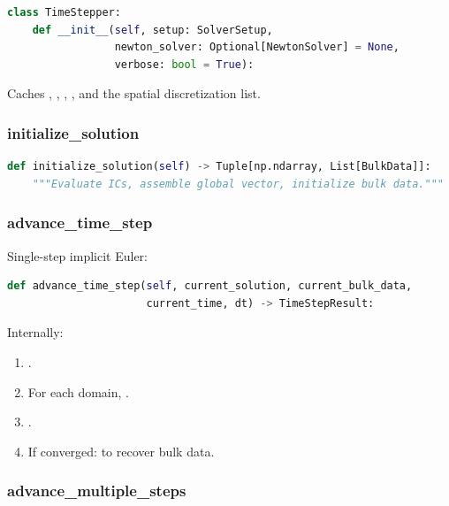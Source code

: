 \begin{lstlisting}[language=Python, caption={TimeStepper constructor}]
class TimeStepper:
    def __init__(self, setup: SolverSetup,
                 newton_solver: Optional[NewtonSolver] = None,
                 verbose: bool = True):
\end{lstlisting}

\noindent Caches , ,
, , and the spatial
discretization list.

\subsubsection{initialize\_solution}

\begin{lstlisting}[language=Python, caption={Initial condition setup}]
def initialize_solution(self) -> Tuple[np.ndarray, List[BulkData]]:
    """Evaluate ICs, assemble global vector, initialize bulk data."""
\end{lstlisting}

\subsubsection{advance\_time\_step}

Single-step implicit Euler:

\begin{lstlisting}[language=Python, caption={One time step}]
def advance_time_step(self, current_solution, current_bulk_data,
                      current_time, dt) -> TimeStepResult:
\end{lstlisting}

\noindent Internally:
\begin{enumerate}
  \item {}.
  \item For each domain, .
  \item {}.
  \item If converged:  to recover bulk data.
\end{enumerate}

\subsubsection{advance\_multiple\_steps}

